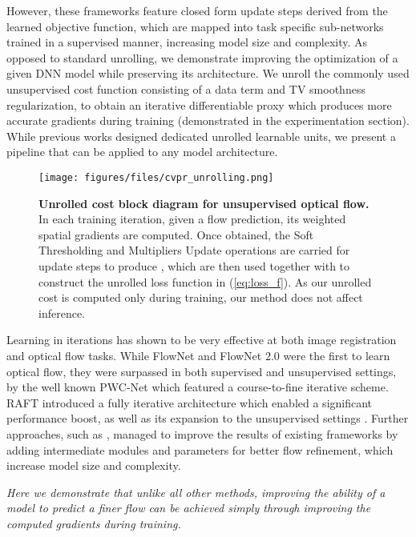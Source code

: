 \documentclass[10pt,twocolumn,letterpaper]{article}
\begin{document}
However, these frameworks feature closed form update steps derived from the learned objective function, which are mapped into task specific sub-networks trained in a supervised manner, increasing model size and complexity. As opposed to standard unrolling, we demonstrate improving the optimization of a given DNN model while preserving its architecture. We unroll the commonly used unsupervised cost function consisting of a data term and TV smoothness regularization, to obtain an iterative differentiable proxy which produces more accurate gradients during training (demonstrated in the experimentation section). While previous works designed dedicated unrolled learnable units, we present a pipeline that can be applied to any model architecture.


\begin{figure*}
\begin{center}
\texttt{[image: figures/files/cvpr\_unrolling.png]}
   \caption{\textbf{Unrolled cost block diagram for unsupervised optical flow.} 
   In each training iteration, given a flow prediction, its weighted spatial gradients  are computed.
   Once obtained, the Soft Thresholding and Multipliers Update operations are carried for update steps  to produce , which are then used together with  to construct the unrolled loss function in \nolinebreak(\ref{eq:loss_f}). As our unrolled cost is computed only during training, our method does not affect inference.}
   
\label{fig:unrol_arch}
\end{center}
\end{figure*}
 
Learning in iterations has shown to be very effective at both image registration and optical flow tasks. While FlowNet and FlowNet 2.0 \cite{dosovitskiy2015flownet,ilg2017flownet} were the first to learn optical flow, they were surpassed in both supervised and unsupervised settings, by the well known PWC-Net \cite{Sun2018PWC-Net} which featured a course-to-fine iterative scheme. RAFT \cite{teed2020raft} introduced a fully iterative architecture which enabled a significant performance boost, as well as its expansion to the unsupervised settings \cite{stone2021smurf}. Further approaches, such as \cite{wang2016proximal,wang2020cot,luo2021upflow}, managed to improve the results of existing frameworks by adding intermediate modules and parameters for better flow refinement, which increase model size and complexity. 

\emph{Here we demonstrate that unlike all other methods, improving the ability of a model to predict a finer flow can be achieved simply through improving the computed gradients during training.}
\end{document}

